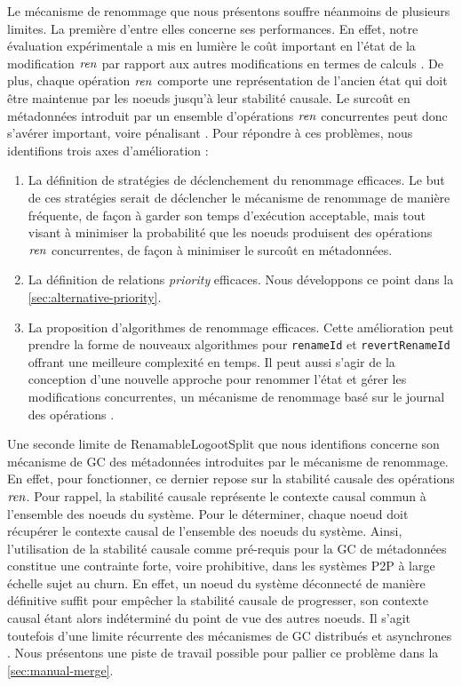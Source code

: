 Le mécanisme de renommage que nous présentons souffre néanmoins de plusieurs limites.
La première d'entre elles concerne ses performances.
En effet, notre évaluation expérimentale a mis en lumière le coût important en l'état de la modification $\mathit{ren}$ par rapport aux autres modifications en termes de calculs .
De plus, chaque opération $\mathit{ren}$ comporte une représentation de l'ancien état qui doit être maintenue par les noeuds jusqu'à leur stabilité causale.
Le surcoût en métadonnées introduit par un ensemble d'opérations $\mathit{ren}$ concurrentes peut donc s'avérer important, voire pénalisant .
Pour répondre à ces problèmes, nous identifions trois axes d'amélioration :
\begin{enumerate}
    \item La définition de stratégies de déclenchement du renommage efficaces.
        Le but de ces stratégies serait de déclencher le mécanisme de renommage de manière fréquente, de façon à garder son temps d'exécution acceptable, mais tout visant à minimiser la probabilité que les noeuds produisent des opérations $\mathit{ren}$ concurrentes, de façon à minimiser le surcoût en métadonnées.
    \item La définition de relations \emph{priority} efficaces.
        Nous développons ce point dans la \autoref{sec:alternative-priority}.
    \item La proposition d'algorithmes de renommage efficaces.
        Cette amélioration peut prendre la forme de nouveaux algorithmes pour \texttt{renameId} et \texttt{revertRenameId} offrant une meilleure complexité en temps.
        Il peut aussi s'agir de la conception d'une nouvelle approche pour renommer l'état et gérer les modifications concurrentes, \eg un mécanisme de renommage basé sur le journal des opérations .
\end{enumerate}

Une seconde limite de RenamableLogootSplit que nous identifions concerne son mécanisme de \ac{GC} des métadonnées introduites par le mécanisme de renommage.
En effet, pour fonctionner, ce dernier repose sur la stabilité causale des opérations $\mathit{ren}$.
Pour rappel, la stabilité causale représente le contexte causal commun à l'ensemble des noeuds du système.
Pour le déterminer, chaque noeud doit récupérer le contexte causal de l'ensemble des noeuds du système.
Ainsi, l'utilisation de la stabilité causale comme pré-requis pour la \ac{GC} de métadonnées constitue une contrainte forte, voire prohibitive, dans les systèmes \ac{P2P} à large échelle sujet au churn.
En effet, un noeud du système déconnecté de manière définitive suffit pour empêcher la stabilité causale de progresser, son contexte causal étant alors indéterminé du point de vue des autres noeuds.
Il s'agit toutefois d'une limite récurrente des mécanismes de \ac{GC} distribués et asynchrones \cite{ROH2011354,baquero2017pure,2018-prunable-authenticated-log-vic}.
Nous présentons une piste de travail possible pour pallier ce problème dans la \autoref{sec:manual-merge}.
